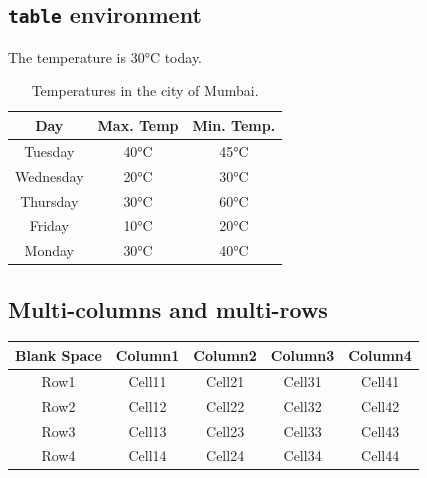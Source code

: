 \documentclass[11pt]{article}
\begin{document}
		\subsection{\texttt{table} environment}
			The temperature is 30\si{\celsius} today.
			\begin{table}[h!]
				\centering	
				\begin{tabular}{ |c|c|c| }
					\hline
					\textbf{Day} & \textbf{Max. Temp} & \textbf{Min. Temp.} \\
					\hline
					Tuesday   & 40\si{\celsius} & 45\si{\celsius} \\
					Wednesday & 20\si{\celsius} & 30\si{\celsius} \\
					Thursday  & 30\si{\celsius} & 60\si{\celsius} \\
					Friday    & 10\si{\celsius} & 20\si{\celsius} \\
					Monday    & 30\si{\celsius} & 40\si{\celsius} \\
					\hline
				\end{tabular}
				\caption{Temperatures in the city of Mumbai.}
				\label{table:temp-mumbai}
			\end{table}

		\subsection{Multi-columns and multi-rows}
			\begin{table}[ht]
				\centering
				\begin{tabular}{*{5}{|c}|}
					\hline
					Blank Space & Column1 & Column2 & Column3 & Column4 \\ \hline
					Row1        & Cell11  & Cell21  & Cell31  & Cell41  \\ \hline
					Row2        & Cell12  & Cell22  & Cell32  & Cell42  \\ \hline
					Row3        & Cell13  & Cell23  & Cell33  & Cell43  \\ \hline
					Row4        & Cell14  & Cell24  & Cell34  & Cell44  \\ \hline
				\end{tabular}
			\end{table}
\end{document}
